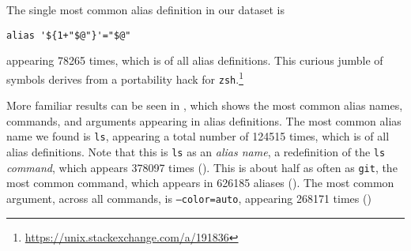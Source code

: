 The single most common alias definition in our dataset is
\begin{verbatim}
alias '${1+"$@"}'="$@"
\end{verbatim}
appearing \num{78265} times, which is  of all alias definitions.
This curious jumble of symbols derives from a portability hack for \texttt{zsh}.\footnote{\url{https://unix.stackexchange.com/a/191836}}

More familiar results can be seen in , which shows the most common alias names, commands, and arguments appearing in alias definitions.
The most common alias name we found is \texttt{ls}, appearing a total number of \num{124515} times, which is  of all alias definitions.
Note that this is \texttt{ls} as an \emph{alias name}, a redefinition of the \texttt{ls} \emph{command}, which appears \num{378097} times ().
This is about half as often as \texttt{git}, the most common command, which appears in \num{626185} aliases ().
The most common argument, across all commands, is \texttt{--color=auto}, appearing \num{268171} times ()

